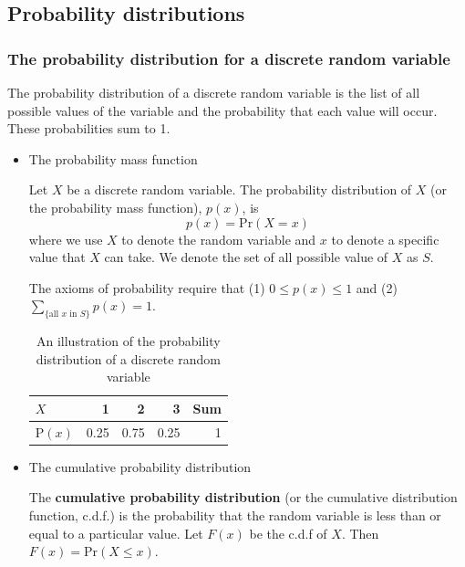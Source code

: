 \documentclass[a4paper,11pt]{article}
\begin{document}
\subsection{Probability distributions}
\label{sec:org06a4152}

\subsubsection*{The probability distribution for a discrete random variable}
\label{sec:org067da62}

The probability distribution of a discrete random variable is the list
of all possible values of the variable and the probability that each
value will occur. These probabilities sum to 1.

\begin{itemize}
\item The probability mass function
\label{sec:orgc8addb9}

Let \(X\) be a discrete random variable. The probability distribution of
\(X\) (or the probability mass function), \(p(x)\), is
\begin{equation*}
p(x) = \mathrm{Pr}(X = x)
\end{equation*}
where we use \(X\) to denote the random variable and \(x\) to denote a
specific value that \(X\) can take. We denote the set of all possible
value of \(X\) as \(S\).

The axioms of probability require that (1) \(0 \leq p(x) \leq
1\) and (2) \(\sum_{ \{\text{all } x \text{ in } S \} } p(x) =
1\).

\begin{table}[htbp]
\caption{\label{tab:org2259b9b}
An illustration of the probability distribution of a discrete random variable}
\centering
\begin{tabular}{lrrrr}
\toprule
\(X\) & 1 & 2 & 3 & Sum\\
\midrule
\(\mathrm{P}(x)\) & 0.25 & 0.75 & 0.25 & 1\\
\bottomrule
\end{tabular}
\end{table}

\item The cumulative probability distribution
\label{sec:orgef25d8c}

The \textbf{cumulative probability distribution} (or the cumulative
distribution function, c.d.f.) is the probability that the random variable is
less than or equal to a particular value. Let \(F(x)\) be the c.d.f of
\(X\). Then \(F(x) = \mathrm{Pr}(X \leq x)\).


\end{itemize}
\end{document}
